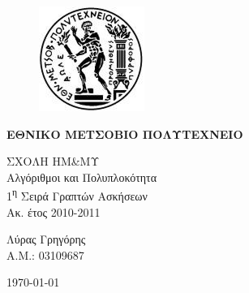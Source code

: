 \begin{titlepage}
\begin{center}
\begin{figure}[t] 
     \includegraphics[scale=0.7]{title/ntua_logo}
\end{figure}
\begin{LARGE}\textbf{ΕΘΝΙΚΟ ΜΕΤΣΟΒΙΟ ΠΟΛΥΤΕΧΝΕΙΟ\\}\end{LARGE}
\vspace{5cm}
\begin{Large}
ΣΧΟΛΗ ΗΜ\&ΜΥ\\
Αλγόριθμοι και Πολυπλοκότητα\\
1\textsuperscript{η} Σειρά Γραπτών Ασκήσεων\\
Ακ. έτος 2010-2011\\
\end{Large}
\vfill
\begin{flushright}
\Large{Λύρας Γρηγόρης}\\
\large{Α.Μ.: 03109687}\\
\end{flushright}
\large\today\\
\end{center}
\end{titlepage}

